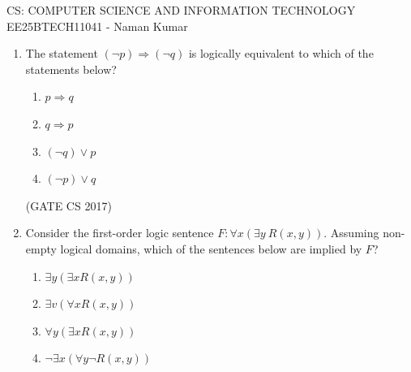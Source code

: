 \documentclass[a4paper, 11pt]{article}
\begin{document}
\begin{center}
    \huge{CS: COMPUTER SCIENCE AND INFORMATION TECHNOLOGY}\\
    \large{EE25BTECH11041 - Naman Kumar}
\end{center}

\begin{enumerate}
    \item The statement $(\neg p)\Rightarrow(\neg q)$ is logically equivalent to which of the statements below?
    \begin{enumerate}[label=\Roman*]
        \item $p\Rightarrow q$ 
        \item $q\Rightarrow p$
        \item $(\neg q)\vee p$
        \item $(\neg p)\vee q$
    \end{enumerate}
    
    \begin{enumerate}
    \end{enumerate}
    
    \hfill (GATE CS 2017)
    
    \item Consider the first-order logic sentence $F\colon \forall x(\exists y~R(x,y))$. Assuming non-empty logical domains, which of the sentences below are implied by $F$?
    \begin{enumerate}[label=\Roman*]
        \item $\exists y(\exists xR(x,y))$
        \item $\exists v(\forall xR(x,y))$
        \item $\forall y(\exists xR(x,y))$
        \item $\neg\exists x(\forall y\neg R(x,y))$
    \end{enumerate}
    
    \begin{enumerate}
    \end{enumerate}
    

\end{enumerate}
\end{document}
